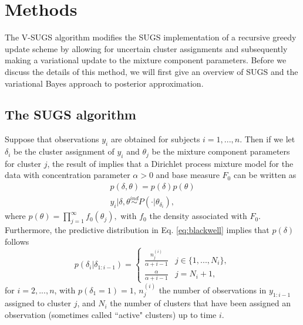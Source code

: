 \documentclass{uwstat572}
\begin{document}
\section{Methods}

The V-SUGS algorithm modifies the SUGS implementation of a recursive greedy update scheme by allowing for uncertain cluster assignments and subsequently making a variational update to the mixture component parameters. Before we discuss the details of this method, we will first give an overview of SUGS and the variational Bayes approach to posterior approximation.

\subsection{The SUGS algorithm}

Suppose that observations $y_i$ are obtained for subjects $i = 1,..., n$. Then if we let $\delta_i$ be the cluster assignment of $y_i$ and $\theta_j$ be the mixture component parameters for cluster $j$, the result of \cite{lo} implies that a Dirichlet process mixture model for the data with concentration parameter $\alpha >  0$ and base measure $F_0$ can be written as 
\begin{align}
p(\delta,\theta) = p(\delta)p(\theta) \nonumber \\
y_i | \delta, \theta \overset{ind}{\sim} P(\cdot | \theta_{\delta_i}), \nonumber
\end{align}
where $ p(\theta) = \prod_{j=1}^\infty f_0(\theta_j),$ with $f_0$ the density associated with $F_0$. Furthermore, the predictive distribution in Eq. \ref{eq:blackwell} implies that $p(\delta)$ follows 
\[ p(\delta_i | \delta_{1:i-1}) = \begin{cases} 
      \frac{n_j^{(i)}}{\alpha+i-1}& j \in \{1,...,N_i\}, \\
      \frac{\alpha}{\alpha+i-1} & j = N_i +1,
   \end{cases}
\]
for $i = 2,...,n$, with $p(\delta_1 = 1) = 1$, $n_j^{(i)}$ the number of observations in $y_{1:i-1}$ assigned to cluster $j$, and $N_i$ the number of clusters that have been assigned an observation (sometimes called ``active" clusters) up to time $i$.
\end{document}

